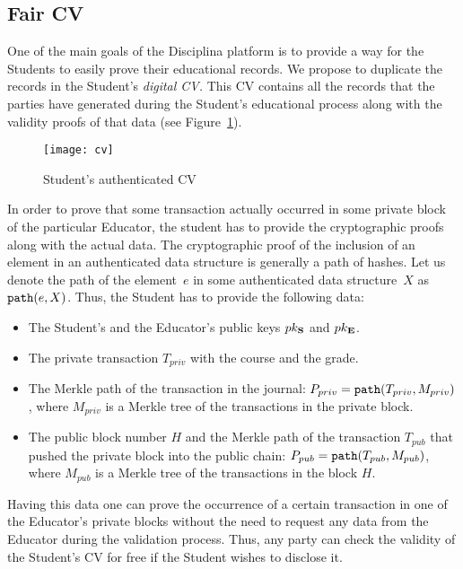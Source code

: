 \subsection{Fair CV}
\label{sec:fair-cv}
One of the main goals of the Disciplina platform is to provide a way for the Students to easily prove their educational records. We propose to duplicate the records in the Student's \textit{digital CV.} This CV contains all the records that the parties have generated during the Student's educational process along with the validity proofs of that data (see Figure~\ref{fig:cv}).

\begin{figure}[ht]
\centering
\texttt{[image: cv]}
\caption{Student's authenticated CV}
\label{fig:cv}
\end{figure}

In order to prove that some transaction actually occurred in some private block of the particular Educator, the student has to provide the cryptographic proofs along with the actual data. The cryptographic proof of the inclusion of an element in an authenticated data structure is generally a path of hashes. Let us denote the path of the element~$e$ in some authenticated data structure~$X$ as~$\mathtt{path}(e, X)$. Thus, the Student has to  provide the following data:
\begin{itemize}
  \item The Student's and the Educator's public keys $pk_{\mathbf{S}}$ and $pk_{\mathbf{E}}$.
  \item The private transaction $T_{priv}$ with the course and the grade.
  \item The Merkle path of the transaction in the journal: $P_{priv} = \mathtt{path}(T_{priv}, M_{priv})$, where $M_{priv}$ is a Merkle tree of the transactions in the private block.
  \item The public block number $H$ and the Merkle path of the transaction $T_{pub}$ that pushed the private block into the public chain: $P_{pub} = \mathtt{path}(T_{pub}, M_{pub})$, where $M_{pub}$ is a Merkle tree of the transactions in the block $H$.
\end{itemize}

Having this data one can prove the occurrence of a certain transaction in one of the Educator's private blocks without the need to request any data from the Educator during the validation process. Thus, any party can check the validity of the Student's CV for free if the Student wishes to disclose it.

